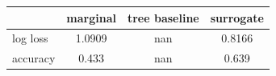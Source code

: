 \begin{tabular}{lccc}
\toprule
 & marginal & tree baseline & surrogate \\
\midrule
log loss & 1.0909 & nan & 0.8166 \\
accuracy & 0.433 & nan & 0.639 \\
\bottomrule
\end{tabular}
